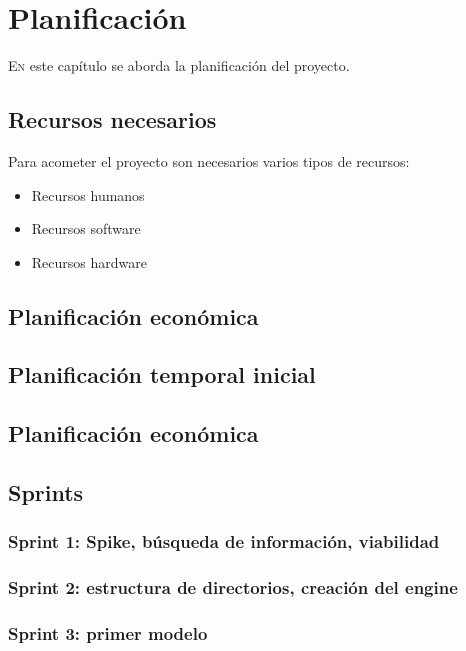 
\chapter{Planificación}
\label{chap:planificación}

\lettrine{E}{n} este capítulo se aborda la planificación del proyecto.

\section{Recursos necesarios}

Para acometer el proyecto son necesarios varios tipos de recursos:

\begin{itemize}
    \item Recursos humanos
    \item Recursos software
    \item Recursos hardware
\end{itemize}

\section{Planificación económica}

\section{Planificación temporal inicial}

\section{Planificación económica}

\section{Sprints}

\subsection{Sprint 1: Spike, búsqueda de información, viabilidad}
\subsection{Sprint 2: estructura de directorios, creación del engine}
\subsection{Sprint 3: primer modelo}
